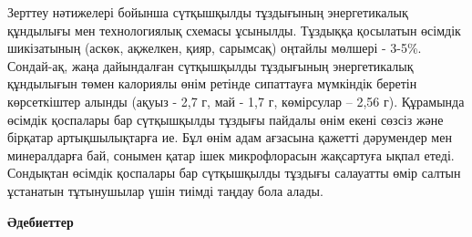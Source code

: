 {Зерттеу нәтижелері бойынша сүтқышқылды тұздығының энергетикалық
құндылығы мен технологиялық схемасы ұсынылды. Тұздыққа қосылатын өсімдік
шикізатының (аскөк, ақжелкен, қияр, сарымсақ) оңтайлы мөлшері - 3-5\%.
Сондай-ақ, жаңа дайындалған сүтқышқылды тұздығының энергетикалық
құндылығын төмен калориялы өнім ретінде сипаттауға мүмкіндік беретін
көрсеткіштер алынды (ақуыз - 2,7 г, май - 1,7 г, көмірсулар -- 2,56 г).
Құрамында өсімдік қоспалары бар сүтқышқылды тұздығы пайдалы өнім екені
сөзсіз және бірқатар артықшылықтарға ие. Бұл өнім адам ағзасына қажетті
дәрумендер мен минералдарға бай, сонымен қатар ішек микрофлорасын
жақсартуға ықпал етеді. Сондықтан өсімдік қоспалары бар сүтқышқылды
тұздығы салауатты өмір салтын ұстанатын тұтынушылар үшін тиімді таңдау
бола алады.

{\bfseries Әдебиеттер}

}
